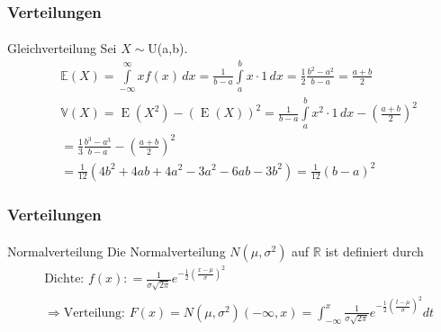 \documentclass{beamer}
\begin{document}
\begin{frame}
    \frametitle{Verteilungen}
\framesubtitle{}

\begin{block}{Gleichverteilung}
Sei $X \sim $U(a,b).
\begin{align*}
& \mathbb{E}(X) =\int\limits_{-\infty}^\infty xf(x)\,dx = \frac 1{b-a}\int\limits_a^b x\cdot 1\,dx = \frac 12\frac{b^2-a^2}{b-a} = \frac{a+b}2 \\
& \mathbb{V}(X) = \operatorname{E}(X^2) - \left({\operatorname{E}(X)} \right)^2  = \frac{1}{b - a}\int\limits_a^b {x^2 \cdot 1\,dx}  - \left( {\frac{a + b}{2}} \right)^2  \\
 & = \frac{1}{3}\frac{b^3  - a^3}{b - a} - \left( {\frac{a + b}{2}} \right)^2 \\
    &= \frac{1}{12}\left( {4b^2  + 4ab + 4a^2  - 3a^2  - 6ab - 3b^2 } \right) = \frac{1}{12}(b - a)^2
\end{align*}
\end{block}
 \end{frame}



\begin{frame}
    \frametitle{Verteilungen}
\framesubtitle{}

\begin{block}{Normalverteilung}
Die Normalverteilung $N{(\mu,\sigma^2)}$ auf $\mathbb{R}$ ist definiert durch
\begin{align*}
& \text{Dichte: } f (x) : = \frac 1{\sigma \sqrt{2\pi}}e^{- \frac {1}{2} (\frac{x- \mu}{ \sigma})^2} \\
&  \Rightarrow \text{Verteilung: } F(x) = N{(\mu,\sigma^2)}(-\infty , x) =  \int_{-\infty}^{x}  \frac 1{\sigma \sqrt{2\pi}}e^{- \frac {1}{2} (\frac{t- \mu}{ \sigma})^2}dt\\
\end{align*}

\end{block}
 \end{frame}
\end{document}
